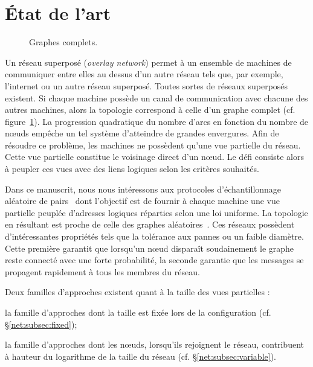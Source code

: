 

\section{État de l'art}
\label{net:sec:stateoftheart}

\begin{figure}
  \begin{center}
    
    \caption[Graphes complets]{\label{net:fig:completegraph}Graphes complets.}
  \end{center}
\end{figure}

Un réseau superposé (\emph{overlay network}) permet à un ensemble de machines de
communiquer entre elles au dessus d'un autre réseau tels que, par exemple,
l'internet ou un autre réseau superposé.  Toutes sortes de réseaux superposés
existent. Si chaque machine possède un canal de communication avec chacune des
autres machines, alors la topologie correspond à celle d'un graphe complet
(cf. figure~\ref{net:fig:completegraph}). La progression quadratique du nombre
d'arcs en fonction du nombre de nœuds empêche un tel système d'atteindre de
grandes envergures. Afin de résoudre ce problème, les machines ne possèdent
qu'une vue partielle du réseau. Cette vue partielle constitue le voisinage
direct d'un nœud. Le défi consiste alors à peupler ces vues avec des liens
logiques selon les critères souhaités.


Dans ce manuscrit, nous nous intéressons aux protocoles d'échantillonnage
aléatoire de pairs~\cite{jelasity2007gossip} dont l'objectif est de fournir à
chaque machine une vue partielle peuplée d'adresses logiques réparties selon une
loi uniforme. La topologie en résultant est proche de celle des graphes
aléatoires~\cite{erdos1959random}. Ces réseaux possèdent d'intéressantes
propriétés tels que la tolérance aux pannes ou un faible diamètre. Cette
première garantit que lorsqu'un nœud disparaît soudainement le graphe reste
connecté avec une forte probabilité, la seconde garantie que les messages se
propagent rapidement à tous les membres du réseau.


\noindent Deux familles d'approches existent quant à la taille des vues partielles :
\begin{inparaenum}[(i)]
\item la famille d'approches dont la taille est fixée lors de la
  configuration%
  (cf. §\ref{net:subsec:fixed});
\item la famille d'approches dont les nœuds, lorsqu'ils rejoignent le réseau,
  contribuent à hauteur du logarithme de la taille du réseau
  (cf. §\ref{net:subsec:variable}).
\end{inparaenum}

